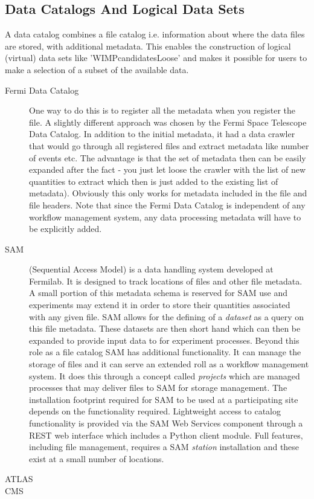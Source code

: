 \subsection{Data Catalogs And Logical Data Sets}
A data catalog combines a file catalog i.e. information about where the data files are stored, with additional metadata.
This enables the construction of logical (virtual) data sets like 'WIMPcandidatesLoose' and makes it possible for users to 
make a selection of a subset of the available data. 

\begin{description}
\item[Fermi Data Catalog] One way to do this is to register all the metadata when you register the file. A slightly
different approach was chosen by the Fermi Space Telescope Data Catalog. In addition to the initial metadata, it had a
data crawler that would go through all registered files and extract metadata like number of events etc. The advantage is
that the set of metadata then can be easily expanded after the fact - you just let loose the crawler with the list
of new quantities to extract which then is just added to the existing list of metadata). Obviously this only works for 
metadata included in the file and file headers.  Note that since the Fermi 
Data Catalog is independent of any workflow management system, any data processing metadata will have to be explicitly added. 



\item[SAM] (Sequential Access Model) is a data handling system
  developed at Fermilab.  It is designed to track locations of files
  and other file metadata.  A small portion of this metadata schema is
  reserved for SAM use and experiments may extend it in order to store
  their quantities associated with any given file.  SAM allows for the
  defining of a \textit{dataset} as a query on this file metadata.
  These datasets are then short hand which can then be expanded to
  provide input data to for experiment processes.  Beyond this role as
  a file catalog SAM has additional functionality.  It can manage the
  storage of files and it can serve an extended roll as a workflow
  management system.  It does this through a concept called
  \textit{projects} which are managed processes that may deliver files
  to SAM for storage management.  The installation footprint required
  for SAM to be used at a participating site depends on the
  functionality required.  Lightweight access to catalog functionality
  is provided via the SAM Web Services component through a REST web
  interface which includes a Python client module.  Full features,
  including file management, requires a SAM \textit{station}
  installation and these exist at a small number of locations.

\item[ATLAS] 

\item[CMS] 

\end{description}

